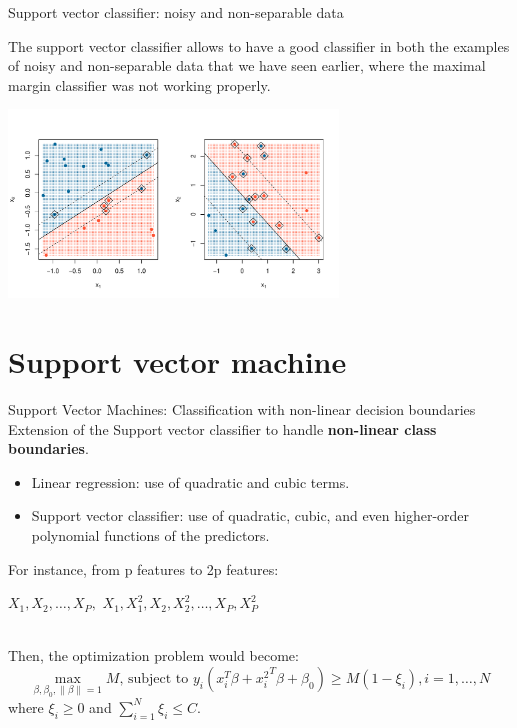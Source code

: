 \documentclass[notes]{beamer}          %
\newcommand{\norm}[1]{\left\lVert#1\right\rVert}
\providecommand{\norm}[1]{\lVert#1\rVert}
\begin{document}
\begin{frame}{Support vector classifier: noisy and non-separable data}

The support vector classifier allows to have a good classifier in both the examples of noisy and non-separable data that we have seen earlier, where the maximal margin classifier was not working properly.

\begin{center}
\includegraphics[height=5cm]{figures/week_6/svm_outlier_or_not_separable_support_vector_classifier.pdf}  
\end{center}

\end{frame}

\section{Support vector machine}
\begin{frame}{Support Vector Machines: Classification with non-linear decision boundaries}
Extension of the Support vector classifier to handle \textbf{non-linear class boundaries}. 
\begin{itemize}
 \item Linear regression: use of quadratic and cubic terms.
 \item Support vector classifier: use of quadratic, cubic, and even higher-order polynomial functions of the predictors.
\end{itemize}
For instance, from p features to 2p features:
\begin{center}{
$X_1, X_2, \dots, X_P,$ \hspace{0.05\textwidth}\to\hspace{0.05\textwidth} $X_1, X^2_1, X_2, X^2_2, \dots, X_P, X^2_P$}
\end{center}\\
Then, the optimization problem would become:\useshortskip
\begin{equation*}
\max_{\beta, \beta_0, \norm{\beta} = 1} M \text{, subject to } y_i(x^T_i \beta + {x^2_i}^T \beta+ \beta_0) \geq M (1-\xi_i), i=1, \dots, N
\end{equation*}
where $\xi_i \geq 0$ and $\sum_{i=1}^N \xi_i \leq C$.
\end{frame}
\end{document}
